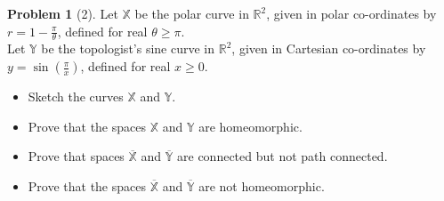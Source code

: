 \documentclass{article}
\theoremstyle{definition}
\newtheorem*{prob}{Problem}
\theoremstyle{theorem}
\begin{document}
\begin{prob}[2]
Let $\mathbb{X}$ be the polar curve in $\mathbb{R}^2$, given in polar co-ordinates by $\displaystyle{r = 1 - \frac{\pi}{\theta}}$, defined for real $\theta \ge \pi$.  \\Let $\mathbb{Y}$ be the topologist's sine curve in $\mathbb{R}^2$, given in Cartesian co-ordinates by  $\displaystyle{y = \sin\left(\frac{\pi}{x}\right)}$, defined for real $x\ge 0$.  
\begin{itemize}\item Sketch the curves $\mathbb{X}$ and $\mathbb{Y}$.
\item Prove that the spaces   $\mathbb{X}$ and $\mathbb{Y}$ are homeomorphic.
\item Prove that spaces $\overline{\mathbb{X}}$ and $\overline{\mathbb{Y}}$ are connected but not path connected.
\item Prove that the spaces $\overline{\mathbb{X}}$ and $\overline{\mathbb{Y}}$ are not homeomorphic.
\end{itemize}
\end{prob}
\end{document}
